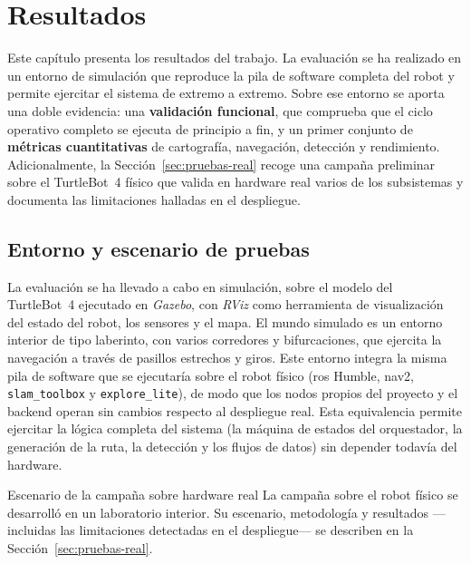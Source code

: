 \chapter{Resultados}
\label{cap:resultados}

Este capítulo presenta los resultados del trabajo. La evaluación se ha realizado en un
entorno de simulación que reproduce la pila de software completa del robot y permite
ejercitar el sistema de extremo a extremo. Sobre ese entorno se aporta una doble
evidencia: una \textbf{validación funcional}, que comprueba que el ciclo operativo
completo se ejecuta de principio a fin, y un primer conjunto de \textbf{métricas
cuantitativas} de cartografía, navegación, detección y rendimiento. Adicionalmente, la
Sección~\ref{sec:pruebas-real} recoge una campaña preliminar sobre el \mbox{TurtleBot~4}
físico que valida en hardware real varios de los subsistemas y documenta las limitaciones
halladas en el despliegue.

\section{Entorno y escenario de pruebas}
\label{sec:entorno-pruebas}

La evaluación se ha llevado a cabo en simulación, sobre el modelo del \mbox{TurtleBot~4}
ejecutado en \textit{Gazebo}, con \textit{RViz} como herramienta de visualización del
estado del robot, los sensores y el mapa. El mundo simulado es un entorno interior de tipo
laberinto, con varios corredores y bifurcaciones, que ejercita la navegación a través de
pasillos estrechos y giros. Este entorno integra la misma pila de software que se
ejecutaría sobre el robot físico (\gls{ros} Humble, \gls{nav2}, \texttt{slam\_toolbox} y
\texttt{explore\_lite}), de modo que los nodos propios del proyecto y el backend operan sin
cambios respecto al despliegue real. Esta equivalencia permite ejercitar la lógica completa
del sistema (la máquina de estados del orquestador, la generación de la ruta, la detección
y los flujos de datos) sin depender todavía del hardware.

\begin{notebox}{Escenario de la campaña sobre hardware real}
  La campaña sobre el robot físico se desarrolló en un laboratorio interior. Su escenario,
  metodología y resultados —incluidas las limitaciones detectadas en el despliegue— se
  describen en la Sección~\ref{sec:pruebas-real}.
\end{notebox}

